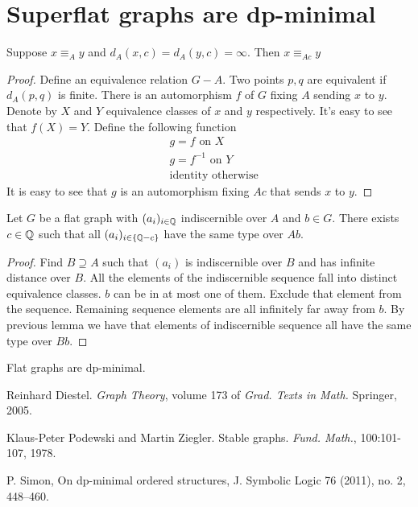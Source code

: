 \documentclass{amsart}
\begin{document}
\section{Superflat graphs are dp-minimal}

\begin{Lemma}
	Suppose $x \equiv_A y$ and $d_A(x, c) = d_A(y, c) = \infty$. Then $x \equiv_{Ac} y$
\end{Lemma}

\begin{proof}
	Define an equivalence relation $G - A$. Two points $p, q$ are equivalent if $d_A(p,q)$ is finite. There is an automorphism $f$ of $G$ fixing $A$ sending $x$ to $y$. Denote by $X$ and $Y$ equivalence classes of $x$ and $y$ respectively. It's easy to see that $f(X) = Y$. Define the following function
	\begin{align*}
		&g = f \text { on } X \\
		&g = f^{-1} \text { on } Y \\
		&\text{identity otherwise}
	\end{align*}
	It is easy to see that $g$ is an automorphism fixing $Ac$ that sends $x$ to $y$.
\end{proof}

\begin{Theorem}
	Let $G$ be a flat graph with $(a_i)_{i\in\mathbb{Q}}$ indiscernible over $A$ and $b \in G$. There exists $c \in \mathbb{Q}$ such that all $(a_i)_{i\in\{\mathbb{Q} - c\}}$ have the same type over $Ab$.
\end{Theorem}

\begin{proof}
	Find $B \supseteq A$ such that $(a_i)$ is indiscernible over $B$ and has infinite distance over $B$. All the elements of the indiscernible sequence fall into distinct equivalence classes. $b$ can be in at most one of them. Exclude that element from the sequence. Remaining sequence elements are all infinitely far away from $b$. By previous lemma we have that elements of indiscernible sequence all have the same type over $Bb$.
\end{proof}

\begin{Corollary}
	Flat graphs are dp-minimal.
\end{Corollary}

\begin{thebibliography}{9}


	Reinhard Diestel. \textit{Graph Theory}, volume 173 of \textit{Grad. Texts in Math.} Springer, 2005.

	Klaus-Peter Podewski and Martin Ziegler. Stable graphs. \textit{Fund. Math.}, 100:101-107, 1978.
	
	P. Simon, On dp-minimal ordered structures, J. Symbolic Logic 76 (2011), no. 2, 448–460.

\end{thebibliography}
\end{document}
